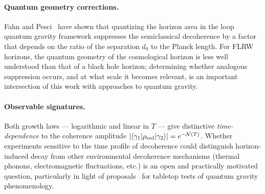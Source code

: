 \paragraph{Quantum geometry corrections.}
Fahn and Pesci~\cite{FahnPesci:2025} have shown that quantizing the horizon
area in the loop quantum gravity framework suppresses the semiclassical
decoherence by a factor that depends on the ratio of the separation $d_0$ to the
Planck length.  For FLRW horizons, the quantum geometry of the cosmological
horizon is less well understood than that of a black hole horizon; determining
whether analogous suppression occurs, and at what scale it becomes relevant, is
an important intersection of this work with approaches to quantum gravity.

\paragraph{Observable signatures.}
Both growth laws — logarithmic and linear in $T$ — give distinctive
\emph{time-dependence} to the coherence amplitude $|\langle \gamma_1 | \rho_{\rm
red} | \gamma_2\rangle| = e^{-\mathcal{N}(T)}$.  Whether experiments sensitive to
the time profile of decoherence could distinguish horizon-induced decay from
other environmental decoherence mechanisms (thermal phonons, electromagnetic
fluctuations, etc.) is an open and practically motivated question, particularly
in light of proposals~\cite{Carney:2019} for tabletop tests of quantum gravity
phenomenology.

